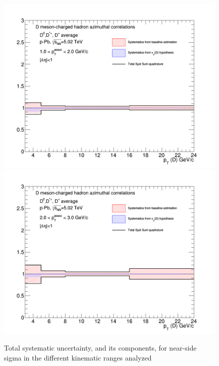 \begin{figure}[!htbp]
{\includegraphics[width=0.49\linewidth, height=0.33\linewidth]{figures/FitOutput/TotalSystematicSourcesNSSigma_pthad1dotto2dot.png}}
{\includegraphics[width=0.49\linewidth, height=0.33\linewidth]{figures/FitOutput/TotalSystematicSourcesNSSigma_pthad2dotto3dot.png}}
\caption{Total systematic uncertainty, and its components, for near-side sigma in the different kinematic ranges analyzed}
\label{fig:NSsigmaTotalUnc}
\end{figure}

